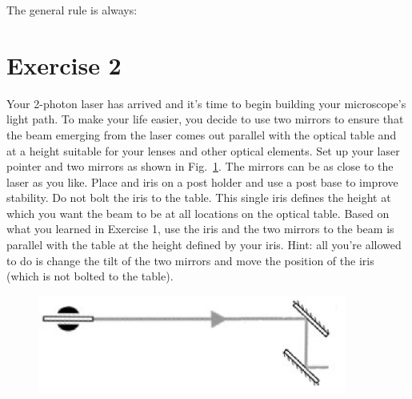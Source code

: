 \documentclass[a4paper]{report}
\begin{document}
The general rule is always:


\section{Exercise 2}
Your 2-photon laser has arrived and it's time to begin building your microscope's light path. 
To make your life easier, you decide to use two mirrors to ensure that the beam emerging from the laser comes out parallel with the optical table and at a height suitable for your lenses and other optical elements. 
Set up your laser pointer and two mirrors as shown in Fig.~\ref{fig:ex2}. 
The mirrors can be as close to the laser as you like. 
Place and iris on a post holder and use a post base to improve stability. 
Do not bolt the iris to the table.
This single iris defines the height at which you want the beam to be at all locations on the optical table. 
Based on what you learned in Exercise 1, use the iris and the two mirrors to the beam is parallel with the table at the height defined by your iris. 
Hint: all you're allowed to do is change the tilt of the two mirrors and move the position of the iris (which is not bolted to the table).


\begin{figure}[h]
\center
\includegraphics[width=4in]{laser_height.eps}
\caption{}
\label{fig:ex2}
\end{figure}
\end{document}
